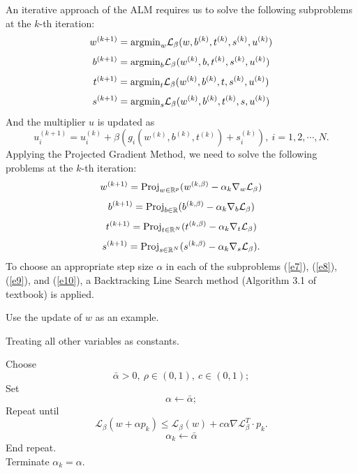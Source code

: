 \documentclass[12pt]{article}
\begin{document}
\vskip 0.2cm
\noindent
An iterative approach of the ALM requires us to solve the following subproblems at the $k$-th iteration:
\begin{equation}\label{e3}
w^{(k+1)}={\rm argmin}_{w}{\mathcal L}_{\beta}(w,b^{(k)},t^{(k)},s^{(k)},u^{(k)})
\end{equation}
\begin{equation}\label{e4}
b^{(k+1)}={\rm argmin}_b{\mathcal L}_{\beta}(w^{(k)},b,t^{(k)},s^{(k)},u^{(k)})
\end{equation}
\begin{equation}\label{e5}
t^{(k+1)}={\rm argmin}_{t}{\mathcal L}_{\beta}(w^{(k)},b^{(k)},t,s^{(k)},u^{(k)})
\end{equation}
\begin{equation}\label{e6}
s^{(k+1)}={\rm argmin}_{s}{\mathcal L}_{\beta}(w^{(k)},b^{(k)},t^{(k)},s,u^{(k)})
\end{equation}
And the multiplier $u$ is updated as 
$$
u_i^{(k+1)}=u_i^{(k)}+\beta(g_i(w^{(k)},b^{(k)},t^{(k)})+s_i^{(k)}), \ i=1,2,\cdots,N.
$$
Applying the Projected Gradient Method, we need to solve the following problems at the $k$-th iteration:
\begin{equation}\label{e7}
w^{(k+1)}={\rm Proj}_{w\in{\mathbb R}^p}(w^{(k,\beta)}-\alpha_k\nabla_w{\mathcal L}_{\beta}) 
\end{equation}
\begin{equation}\label{e8}
b^{(k+1)}={\rm Proj}_{b\in{\mathbb R}}(b^{(k,\beta)}-\alpha_k\nabla_b{\mathcal L}_{\beta})
\end{equation}
\begin{equation}\label{e9}
t^{(k+1)}={\rm Proj}_{t\in{\mathbb R}^N}(t^{(k,\beta)}-\alpha_k\nabla_t{\mathcal L}_{\beta})
\end{equation}
\begin{equation}\label{e10}
s^{(k+1)}={\rm Proj}_{s\in{\mathbb R}^N}(s^{(k,\beta)}-\alpha_k\nabla_s{\mathcal L}_{\beta}).
\end{equation}
To choose an appropriate step size $\alpha$ in each of the subproblems (\ref{e7}), (\ref{e8}), (\ref{e9}), and (\ref{e10}), a Backtracking Line Search method (Algorithm 3.1 of textbook) is applied. 

\vskip 0.2cm
\noindent
Use the update of $w$ as an example. 

\vskip 0.2cm
\noindent
Treating all other variables as constants.

\vskip 0.2cm
\noindent
Choose
$$\bar{\alpha}>0, \  \rho\in (0,1),  \ c\in(0,1);
$$
Set 
$$
\alpha \leftarrow \bar{\alpha};$$
Repeat until
$$
{\mathcal L}_{\beta}(w+\alpha p_k)\leq {\mathcal L}_{\beta}(w)+c\alpha\nabla{\mathcal L}_{\beta}^T\cdot p_k.
$$
$$
\alpha_k\leftarrow \bar{\alpha}
$$
End repeat.\\
Terminate $\alpha_k=\alpha$.
\end{document}
